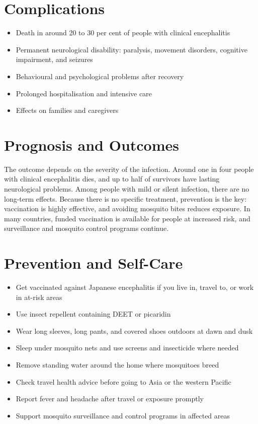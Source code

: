 \section*{Complications}
\begin{itemize}
    \item Death in around 20 to 30 per cent of people with clinical encephalitis
    \item Permanent neurological disability: paralysis, movement disorders, cognitive impairment, and seizures
    \item Behavioural and psychological problems after recovery
    \item Prolonged hospitalisation and intensive care
    \item Effects on families and caregivers
\end{itemize}

\section*{Prognosis and Outcomes}
The outcome depends on the severity of the infection. Around one in four people with clinical encephalitis dies, and up to half of survivors have lasting neurological problems. Among people with mild or silent infection, there are no long-term effects. Because there is no specific treatment, prevention is the key: vaccination is highly effective, and avoiding mosquito bites reduces exposure. In many countries, funded vaccination is available for people at increased risk, and surveillance and mosquito control programs continue.

\section*{Prevention and Self-Care}
\begin{itemize}
    \item Get vaccinated against Japanese encephalitis if you live in, travel to, or work in at-risk areas
    \item Use insect repellent containing DEET or picaridin
    \item Wear long sleeves, long pants, and covered shoes outdoors at dawn and dusk
    \item Sleep under mosquito nets and use screens and insecticide where needed
    \item Remove standing water around the home where mosquitoes breed
    \item Check travel health advice before going to Asia or the western Pacific
    \item Report fever and headache after travel or exposure promptly
    \item Support mosquito surveillance and control programs in affected areas
\end{itemize}


